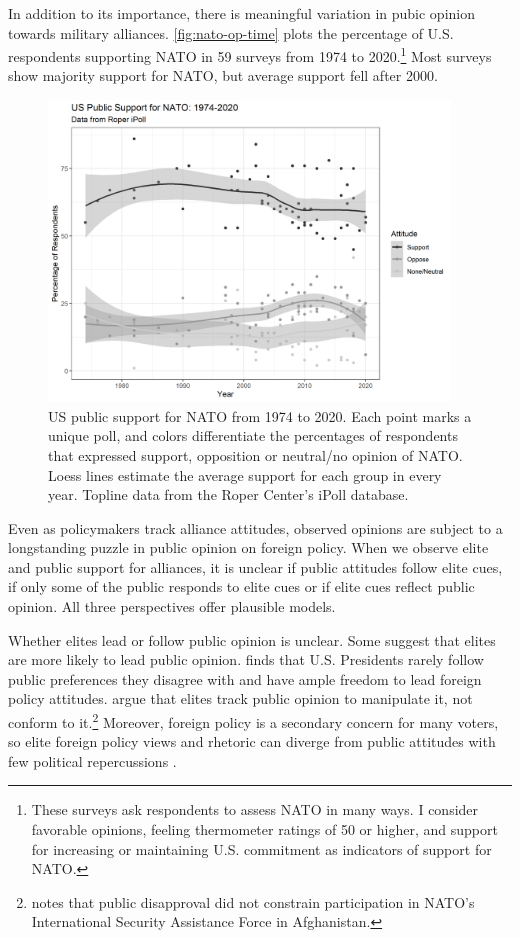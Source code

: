\documentclass[12pt]{article}
\begin{document}
In addition to its importance, there is meaningful variation in pubic opinion towards military alliances. 
\autoref{fig:nato-op-time} plots the percentage of U.S. respondents supporting NATO in 59 surveys from 1974 to 2020.\footnote{These surveys ask respondents to assess NATO in many ways. I consider favorable opinions, feeling thermometer ratings of 50 or higher, and support for increasing or maintaining U.S. commitment as indicators of support for NATO.} 
Most surveys show majority support for NATO, but average support fell after 2000.  


\begin{figure}
	\centering
		\includegraphics[width=0.95\textwidth]{../figures/nato-op-time.png}
	\caption{US public support for NATO from 1974 to 2020. Each point marks a unique poll, and colors differentiate the percentages of respondents that expressed support, opposition or neutral/no opinion of NATO. Loess lines estimate the average support for each group in every year. Topline data from the Roper Center's iPoll database.}
	\label{fig:nato-op-time}
\end{figure}


Even as policymakers track alliance attitudes, observed opinions are subject to a longstanding puzzle in public opinion on foreign policy.
When we observe elite and public support for alliances, it is unclear if public attitudes follow elite cues, if only some of the public responds to elite cues or if elite cues reflect public opinion. 
All three perspectives offer plausible models. 


Whether elites lead or follow public opinion is unclear.
Some suggest that elites are more likely to lead public opinion. 
\citet{Canes-Wrone2006} finds that U.S. Presidents rarely follow public preferences they disagree with and have ample freedom to lead foreign policy attitudes. 
\citet{JacobsShapiro2000} argue that elites track public opinion to manipulate it, not conform to it.\footnote{\citet{Kreps2010} notes that public disapproval did not constrain participation in NATO's International Security Assistance Force in Afghanistan.}
Moreover, foreign policy is a secondary concern for many voters, so elite foreign policy views and rhetoric can diverge from public attitudes with few political repercussions \citep{BusbyMonten2012}. 
\end{document}
